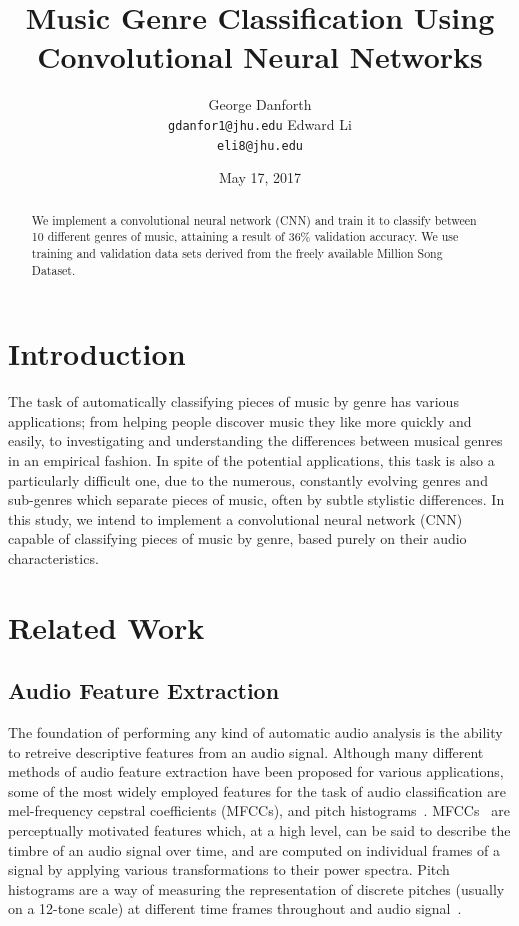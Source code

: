 \documentclass{article} %
\title{Music Genre Classification Using Convolutional Neural Networks}
\author{
George Danforth \\
\texttt{gdanfor1@jhu.edu}
\And\-Edward Li \\
\texttt{eli8@jhu.edu}
}
\date{May 17, 2017}
\begin{document}
\maketitle

\begin{abstract}
We implement a convolutional neural network (CNN) and train it to classify between 10 different genres of music, attaining a result of 36\% validation accuracy. We use training and validation data sets derived from the freely available Million Song Dataset.
\end{abstract}

\section{Introduction}
The task of automatically classifying pieces of music by genre has various applications; from helping people discover music they like more quickly and easily, to investigating and understanding the differences between musical genres in an empirical fashion. In spite of the potential applications, this task is also a particularly difficult one, due to the numerous, constantly evolving genres and sub-genres which separate pieces of music, often by subtle stylistic differences.
In this study, we intend to implement a convolutional neural network (CNN) capable of classifying pieces of music by genre, based purely on their audio characteristics.


\section{Related Work}
\subsection{Audio Feature Extraction}
The foundation of performing any kind of automatic audio analysis is the ability to retreive descriptive features from an audio signal. Although many different methods of audio feature extraction have been proposed for various applications, some of the most widely employed features for the task of audio classification are mel-frequency cepstral coefficients (MFCCs), and pitch histograms~\cite{survey}. MFCCs~\cite{mfcc} are perceptually motivated features which, at a high level, can be said to describe the timbre of an audio signal over time, and are computed on individual frames of a signal by applying various transformations to their power spectra. Pitch histograms are a way of measuring the representation of discrete pitches (usually on a 12-tone scale) at different time frames throughout and audio signal~\cite{gtzan}.
\end{document}

